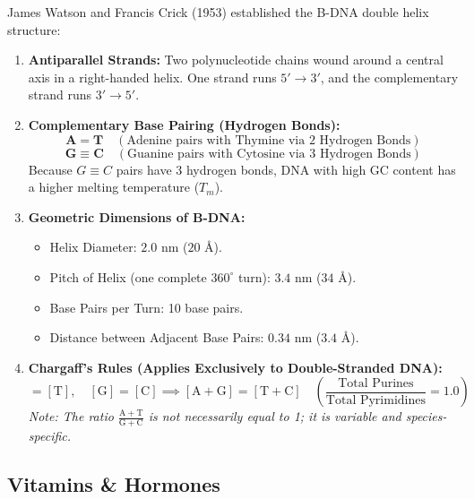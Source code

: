 \documentclass[10pt,a4paper]{article}
\begin{document}
\begin{formulabox}
James Watson and Francis Crick (1953) established the B-DNA double helix structure:
\begin{enumerate}[leftmargin=*]
  \item \textbf{Antiparallel Strands:} Two polynucleotide chains wound around a central axis in a right-handed helix. One strand runs $5' \to 3'$, and the complementary strand runs $3' \to 5'$.
  \item \textbf{Complementary Base Pairing (Hydrogen Bonds):}
  \begin{equation}
    \mathbf{A = T} \quad (\text{Adenine pairs with Thymine via 2 Hydrogen Bonds})
  \end{equation}
  \begin{equation}
    \mathbf{G \equiv C} \quad (\text{Guanine pairs with Cytosine via 3 Hydrogen Bonds})
  \end{equation}
  Because $G\equiv C$ pairs have 3 hydrogen bonds, DNA with high GC content has a higher melting temperature ($T_m$).
  \item \textbf{Geometric Dimensions of B-DNA:}
  \begin{itemize}
    \item Helix Diameter: $2.0\text{ nm}$ ($20\text{ \AA}$).
    \item Pitch of Helix (one complete $360^\circ$ turn): $3.4\text{ nm}$ ($34\text{ \AA}$).
    \item Base Pairs per Turn: 10 base pairs.
    \item Distance between Adjacent Base Pairs: $0.34\text{ nm}$ ($3.4\text{ \AA}$).
  \end{itemize}
  \item \textbf{Chargaff's Rules (Applies Exclusively to Double-Stranded DNA):}
  \begin{equation}
    [\mathrm{A}] = [\mathrm{T}], \quad [\mathrm{G}] = [\mathrm{C}] \implies [\mathrm{A} + \mathrm{G}] = [\mathrm{T} + \mathrm{C}] \quad \left(\frac{\text{Total Purines}}{\text{Total Pyrimidines}} = 1.0\right)
  \end{equation}
  \textit{Note: The ratio $\frac{\mathrm{A+T}}{\mathrm{G+C}}$ is not necessarily equal to 1; it is variable and species-specific.}
\end{enumerate}
\end{formulabox}

\subsection{Vitamins \& Hormones}
\end{document}
